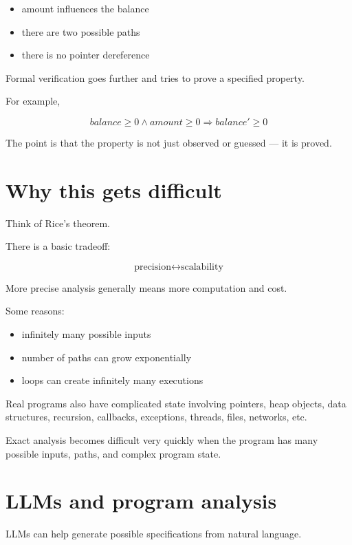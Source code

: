 \documentclass[11pt]{book}
\begin{document}
\begin{itemize}
    \item amount influences the balance
    \item there are two possible paths
    \item there is no pointer dereference
\end{itemize}

Formal verification goes further and tries to prove
a specified property.

For example,

\[
balance \geq 0 \land amount \geq 0
\Rightarrow
balance' \geq 0
\]

The point is that the property is not just observed
or guessed --- it is proved.

\section{Why this gets difficult}

Think of Rice's theorem.

There is a basic tradeoff:

\[
\text{precision}
\longleftrightarrow
\text{scalability}
\]

More precise analysis generally means more computation
and cost.

Some reasons:

\begin{itemize}
    \item infinitely many possible inputs
    \item number of paths can grow exponentially
    \item loops can create infinitely many executions
\end{itemize}

Real programs also have complicated state involving
pointers, heap objects, data structures, recursion,
callbacks, exceptions, threads, files, networks, etc.

\begin{ppnote}
Exact analysis becomes difficult very quickly when the
program has many possible inputs, paths, and complex
program state.
\end{ppnote}

\section{LLMs and program analysis}

LLMs can help generate possible specifications
from natural language.
\end{document}
